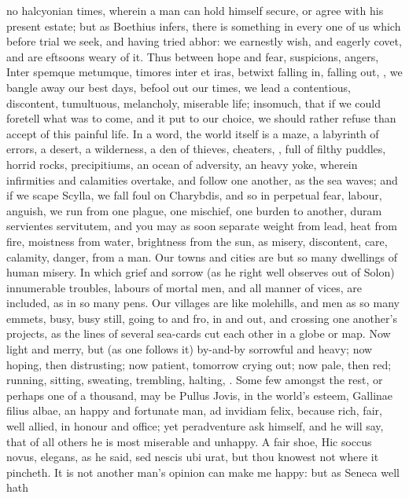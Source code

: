 {no halcyonian times, wherein a man can hold himself secure, or agree
with his present estate; but as Boethius infers, there is
something in every one of us which before trial we seek, and having
tried abhor:  we earnestly wish, and eagerly covet, and are
eftsoons weary of it. Thus between hope and fear, suspicions, angers,
Inter spemque metumque, timores inter et iras, betwixt falling
in, falling out, \etc{}, we bangle away our best days, befool out our
times, we lead a contentious, discontent, tumultuous, melancholy,
miserable life; insomuch, that if we could foretell what was to come,
and it put to our choice, we should rather refuse than accept of this
painful life. In a word, the world itself is a maze, a labyrinth of
errors, a desert, a wilderness, a den of thieves, cheaters, \etc{}, full
of filthy puddles, horrid rocks, precipitiums, an ocean of adversity,
an heavy yoke, wherein infirmities and calamities overtake, and follow
one another, as the sea waves; and if we scape Scylla, we fall foul on
Charybdis, and so in perpetual fear, labour, anguish, we run from one
plague, one mischief, one burden to another, duram servientes
servitutem, and you may as soon separate weight from lead, heat from
fire, moistness from water, brightness from the sun, as misery,
discontent, care, calamity, danger, from a man. Our towns and cities
are but so many dwellings of human misery. In which grief and sorrow
(as he right well observes out of Solon) innumerable troubles,
labours of mortal men, and all manner of vices, are included, as in so
many pens. Our villages are like molehills, and men as so many emmets,
busy, busy still, going to and fro, in and out, and crossing one
another's projects, as the lines of several sea-cards cut each other in
a globe or map. Now light and merry, but (as one follows it)
by-and-by sorrowful and heavy; now hoping, then distrusting; now
patient, tomorrow crying out; now pale, then red; running, sitting,
sweating, trembling, halting, \etc{}. Some few amongst the rest, or perhaps
one of a thousand, may be Pullus Jovis, in the world's esteem, Gallinae
filius albae, an happy and fortunate man, ad invidiam felix, because
rich, fair, well allied, in honour and office; yet peradventure ask
himself, and he will say, that of all others he is most miserable
and unhappy. A fair shoe, Hic soccus novus, elegans, as he said,
sed nescis ubi urat, but thou knowest not where it pincheth. It is not
another man's opinion can make me happy: but as Seneca well hath
}
